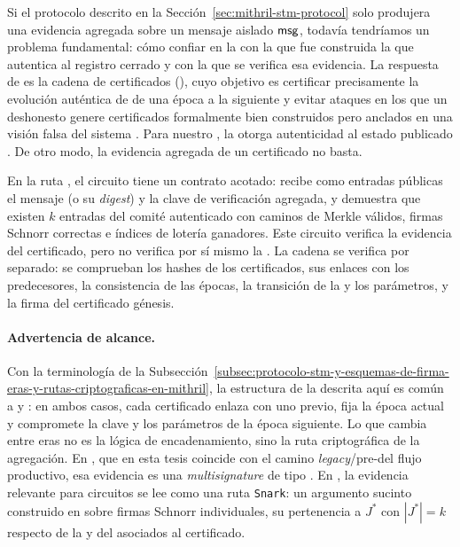 
Si el protocolo \STM descrito en la Sección~\ref{sec:mithril-stm-protocol} solo produjera una evidencia agregada sobre un mensaje aislado $\mathsf{msg}$, todavía tendríamos un problema fundamental: cómo confiar en la \StakeDistribution con la que fue construida la \AVK que autentica al registro cerrado \AuthReg y con la que se verifica esa evidencia. La respuesta de \Mithril es la cadena de certificados (\CertificateChain), cuyo objetivo es certificar precisamente la evolución auténtica de \AuthReg de una época a la siguiente y evitar ataques en los que un \MithrilAggregator deshonesto genere certificados formalmente bien construidos pero anclados en una visión falsa del sistema \cite{MithrilDocsCertChain,MithrilDocsThreatModel}. Para nuestro \zkBridge, la \CertificateChain otorga autenticidad al estado publicado \Onchain. De otro modo, la evidencia agregada de un certificado \TransactionSnapshotCertificate no basta.

En la ruta \Lagrange, el circuito \HaloTwo tiene un contrato acotado: recibe como entradas públicas el mensaje (o su \textit{digest}) y la clave de verificación agregada, y demuestra que existen $k$ entradas del comité autenticado con caminos de Merkle válidos, firmas Schnorr correctas e índices de lotería ganadores. Este circuito verifica la evidencia \STM del certificado, pero no verifica por sí mismo la \CertificateChain. La cadena se verifica por separado: se comprueban los hashes de los certificados, sus enlaces con los predecesores, la consistencia de las épocas, la transición de la \AVK y los parámetros, y la firma del certificado génesis.

\paragraph{Advertencia de alcance.}
Con la terminología de la Subsección~\ref{subsec:protocolo-stm-y-esquemas-de-firma-eras-y-rutas-criptograficas-en-mithril}, la estructura de la \CertificateChain descrita aquí es común a \Pythagoras y \Lagrange: en ambos casos, cada certificado enlaza con uno previo, fija la época actual y compromete la clave y los parámetros de la época siguiente. Lo que cambia entre eras no es la lógica de encadenamiento, sino la ruta criptográfica de la agregación. En \Pythagoras, que en esta tesis coincide con el camino \textit{legacy}/pre-\Lagrange del flujo productivo, esa evidencia es una \BLS \textit{multisignature} de tipo \Concatenation. En \Lagrange, la evidencia relevante para circuitos se lee como una ruta \texttt{Snark}: un argumento sucinto construido en \HaloTwo sobre firmas Schnorr individuales, su pertenencia a $J^*$ con $|J^*| = k$ respecto de la \AVK y del \ProtocolMsg asociados al certificado.

